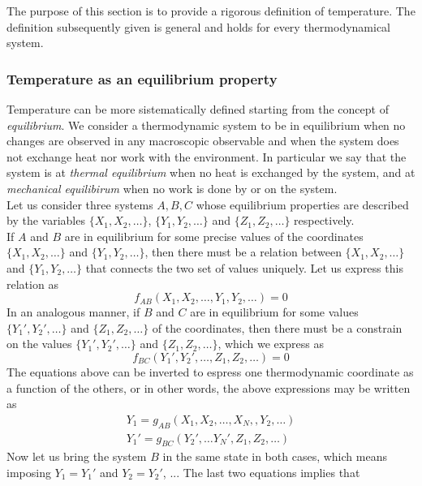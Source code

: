 The purpose of this section is to provide a rigorous definition of temperature. The definition subsequently given is general and holds for every thermodynamical system.
\subsubsection*{Temperature as an equilibrium property}
Temperature can be more sistematically defined starting from the concept of \emph{equilibrium}. We consider a thermodynamic system to be in equilibrium when 
no changes are observed in any macroscopic observable and when the system does not exchange heat nor work with the environment. In particular we say that the system is at \emph{thermal equilibrium} when no heat is exchanged by the system, and
at \emph{mechanical equilibirum} when no work is done by or on the system. \\
Let us consider three systems $A, B, C$ whose equilibrium properties are described by the variables
$\{X_1, X_2, \dots\}$, $\{Y_1, Y_2, \dots\}$ and $\{Z_1, Z_2, \dots\}$ respectively. \\
If $A$ and $B$ are in equilibrium for some precise values of the coordinates $\{X_1, X_2, \dots\}$ and $\{Y_1, Y_2, \dots\}$, then there must be a relation between $\{X_1, X_2, \dots\}$ and $\{Y_1, Y_2, \dots\}$ that connects the two set of values uniquely. Let us express this relation as
\begin{equation}
    f_{AB}(X_1, X_2, \dots, Y_1, Y_2, \dots) = 0
    \label{eq:constrain1}
\end{equation}
In an analogous manner, if $B$ and $C$ are in equilibrium for some values $\{Y_1', Y_2', \dots\}$ and $\{Z_1, Z_2, \dots\}$ of the coordinates, then there must be a constrain on the values $\{Y_1', Y_2', \dots\}$ and $\{Z_1, Z_2, \dots\}$, which we express as
\begin{equation}
    f_{BC}(Y_1', Y_2', \dots, Z_1, Z_2, \dots) = 0
    \label{eq:constrain2}
\end{equation}
The equations above can be inverted to espress one thermodynamic coordinate as a function of the others, or in other words, the above expressions may be written as
\begin{gather*}
    Y_1 = g_{AB} (X_1, X_2, \dots, X_N,, Y_2, \dots) \\
    Y_1' = g_{BC} (Y_2', \dots Y_N', Z_1, Z_2, \dots)
\end{gather*}
Now let us bring the system $B$ in the same state in both cases, which means imposing $Y_1 = Y_1'$ and $Y_2 = Y_2'$, ... The last two equations implies that 
